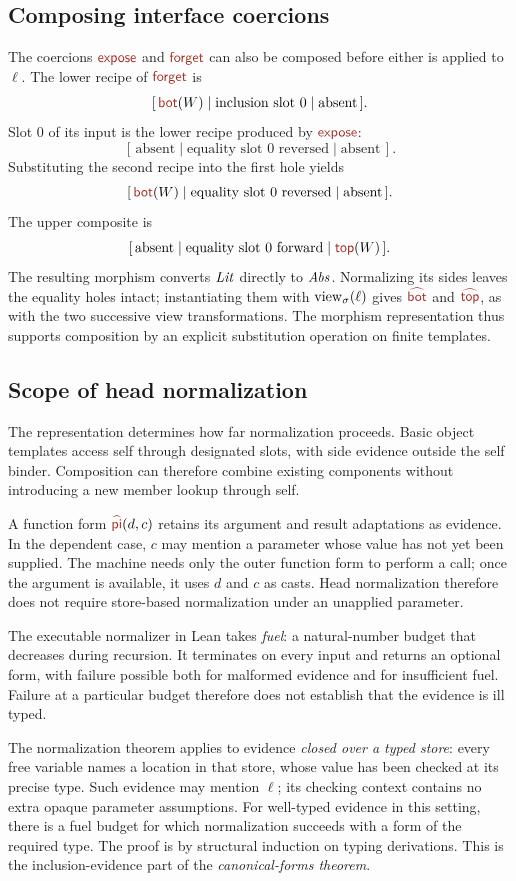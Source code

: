 \subsection*{Composing interface coercions}
The coercions $\ev{expose}$ and $\ev{forget}$ can also be composed
before either is applied to $\ell$.
The lower recipe of $\ev{forget}$ is
\[
 [\,\ev{bot}(W)\mid\text{inclusion slot }0\mid\text{absent}\,].
\]
Slot 0 of its input is the lower recipe produced by
$\ev{expose}$:
\[
 [\,\text{absent}\mid\text{equality slot }0\text{ reversed}\mid
       \text{absent}\,].
\]
Substituting the second recipe into the first hole yields
\[
 [\,\ev{bot}(W)\mid\text{equality slot }0\text{ reversed}\mid
       \text{absent}\,].
\]
The upper composite is
\[
 [\,\text{absent}\mid\text{equality slot }0\text{ forward}\mid
       \ev{top}(W)\,].
\]
The resulting morphism converts $\mathit{Lit}$ directly to $\mathit{Abs}$.
Normalizing its sides leaves the equality holes intact; instantiating
them with $\operatorname{view}_{\sigma}(\ell)$ gives $\form{bot}$ and $\form{top}$, as with the
two successive view transformations. The morphism representation thus
supports composition by an explicit substitution operation on finite
templates.

\subsection*{Scope of head normalization}
The representation determines how far normalization proceeds.
Basic object templates access self through designated slots, with side
evidence outside the self binder. Composition can therefore combine
existing components without introducing a new member lookup through self.

A function form $\form{pi}(d,c)$ retains its argument and result
adaptations as evidence. In the dependent case, $c$ may mention a parameter
whose value has not yet been supplied. The machine needs only the outer
function form to perform a call; once the argument is available, it uses
$d$ and $c$ as casts. Head normalization therefore does not require
store-based normalization under an unapplied parameter.

The executable normalizer in Lean takes \emph{fuel}: a natural-number
budget that decreases during recursion. It terminates on every input
and returns an optional form, with failure possible both for malformed
evidence and for insufficient fuel. Failure at a particular budget
therefore does not establish that the evidence is ill typed.

The normalization theorem applies to evidence \emph{closed over a typed
store}: every free variable names a location in that store, whose value
has been checked at its precise type. Such evidence may mention $\ell$;
its checking context contains no extra opaque parameter assumptions.
For well-typed evidence in this setting, there is a fuel budget for which
normalization succeeds with a form of the required type. The proof is by
structural induction on typing derivations.
This is the inclusion-evidence part of the \emph{canonical-forms theorem}.

